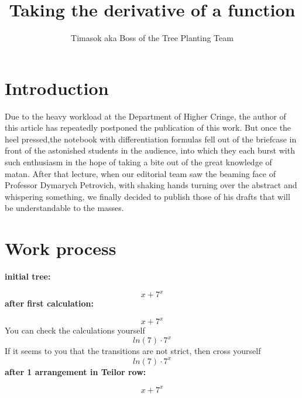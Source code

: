 \documentclass{article}
\title{\textbf{Taking the derivative of a function}}
\author{Timasok aka Boss of the Tree Planting Team}
\begin{document}
\maketitle
\section{Introduction}
Due to the heavy workload at the Department of Higher Cringe, the author of this article has repeatedly postponed the publication of this work. But once the heel pressed,the notebook with differentiation formulas fell out of the briefcase in front of the astonished students in the audience, into which they each burst with such enthusiasm in the hope of taking a bite out of the great knowledge of matan. After that lecture, when our editorial team saw the beaming face of Professor Dymarych Petrovich, with shaking hands turning over the abstract and whispering something, we finally decided to publish those of his drafts that will be understandable to the masses. 
\section{Work process}
\textbf{initial tree:}

$$
x+7^{x}
$$
\textbf{after first calculation:}

$$
x+7^{x}
$$
You can check the calculations yourself
$$
ln{(7)}\cdot 7^{x}
$$
If it seems to you that the transitions are not strict, then cross yourself
$$
ln{(7)}\cdot 7^{x}
$$
\textbf{after 1 arrangement in Teilor row:}

$$
x+7^{x}
$$
\end{document}
